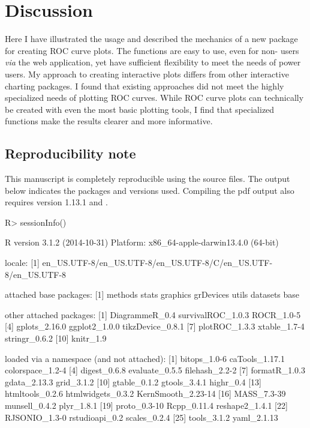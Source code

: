 \documentclass[codesnippet]{jss}
\begin{document}
\section{Discussion}\label{discussion}

Here I have illustrated the usage and described the mechanics of a new
 package for creating ROC curve plots. The functions are
easy to use, even for non- users \emph{via} the web
application, yet have sufficient flexibility to meet the needs of power
users. My approach to creating interactive plots differs from other
interactive charting packages. I found that existing approaches did not
meet the highly specialized needs of plotting ROC curves. While ROC
curve plots can technically be created with even the most basic plotting
tools, I find that specialized functions make the results clearer and
more informative.

\subsection{Reproducibility note}\label{reproducibility-note}

This manuscript is completely reproducible using the source files. The
output below indicates the  packages and versions used.
Compiling the pdf output also requires  version 1.13.1 and
.

\begin{Schunk}
\begin{Sinput}
R> sessionInfo()
\end{Sinput}
\begin{Soutput}
R version 3.1.2 (2014-10-31)
Platform: x86_64-apple-darwin13.4.0 (64-bit)

locale:
[1] en_US.UTF-8/en_US.UTF-8/en_US.UTF-8/C/en_US.UTF-8/en_US.UTF-8

attached base packages:
[1] methods   stats     graphics  grDevices utils     datasets  base     

other attached packages:
 [1] DiagrammeR_0.4    survivalROC_1.0.3 ROCR_1.0-5       
 [4] gplots_2.16.0     ggplot2_1.0.0     tikzDevice_0.8.1 
 [7] plotROC_1.3.3     xtable_1.7-4      stringr_0.6.2    
[10] knitr_1.9        

loaded via a namespace (and not attached):
 [1] bitops_1.0-6       caTools_1.17.1     colorspace_1.2-4  
 [4] digest_0.6.8       evaluate_0.5.5     filehash_2.2-2    
 [7] formatR_1.0.3      gdata_2.13.3       grid_3.1.2        
[10] gtable_0.1.2       gtools_3.4.1       highr_0.4         
[13] htmltools_0.2.6    htmlwidgets_0.3.2  KernSmooth_2.23-14
[16] MASS_7.3-39        munsell_0.4.2      plyr_1.8.1        
[19] proto_0.3-10       Rcpp_0.11.4        reshape2_1.4.1    
[22] RJSONIO_1.3-0      rstudioapi_0.2     scales_0.2.4      
[25] tools_3.1.2        yaml_2.1.13       
\end{Soutput}
\end{Schunk}


%

\end{document}
